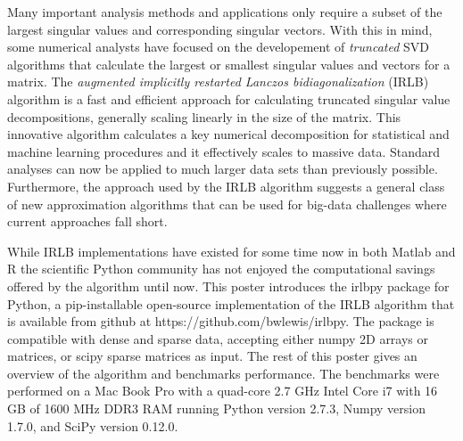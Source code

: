 \documentclass[landscape,a0b,final]{a0poster}
\newenvironment{poster}{
  \begin{center}
  \begin{minipage}[c]{0.98\textwidth}
}{
  \end{minipage} 
  \end{center}
}
\newcommand{\pbox}[4]{
\psshadowbox[#3]{
\begin{minipage}[t][#2][t]{#1}
#4
\end{minipage}
}}
\begin{document}
\begin{poster}
\begin{multicols}{3}
\vspace{0.75cm}

Many important analysis methods and applications only require a subset of the
largest singular values and corresponding singular vectors. With this in mind,
some numerical analysts have focused on the developement of {\em truncated} SVD
algorithms that calculate the largest or smallest singular values and vectors
for a matrix.  The {\em augmented implicitly restarted Lanczos
bidiagonalization} (IRLB) algorithm \cite{Baglama2006} is a fast and efficient
approach for calculating truncated singular value decompositions, generally
scaling linearly in the size of the matrix. This innovative algorithm
calculates a key numerical decomposition for statistical and machine learning
procedures and it effectively scales to massive data.  Standard analyses can
now be applied to much larger data sets than previously possible.  Furthermore,
the approach used by the IRLB algorithm suggests a general class of new
approximation algorithms that can be used for big-data challenges where current
approaches fall short.

\vspace{0.75cm}

While IRLB implementations have existed for some time now in both Matlab
\cite{irlbaMatlab} and R \cite{irlbaR} the scientific Python community has not
enjoyed the computational savings offered by the algorithm until now.  This
poster introduces the irlbpy package for Python, a pip-installable open-source
implementation of the IRLB algorithm that is available from github at
https://github.com/bwlewis/irlbpy. The package is compatible with dense and
sparse data, accepting either numpy 2D arrays or matrices, or scipy sparse
matrices as input. The rest of this poster gives an overview of the algorithm
and benchmarks performance.  The benchmarks were performed on a Mac Book Pro
with a quad-core 2.7 GHz Intel Core i7 with 16 GB of 1600 MHz DDR3 RAM running
Python version 2.7.3, Numpy version 1.7.0, and SciPy version 0.12.0.

\columnbreak

\vspace{2cm}\begin{center}\pbox{0.8\columnwidth}{}{linewidth=2mm,framearc=0.1,fillstyle=gradient,gradangle=0,gradbegin=white,gradend=white,gradmidpoint=1.0,framesep=1em}{\begin{center}\bf{Partial SVD Definition}\end{center}}\end{center}\vspace{1.25cm}


\end{multicols}
\end{poster}
\end{document}
